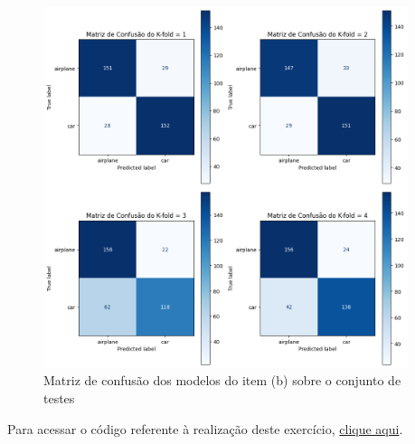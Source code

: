 \documentclass[]{abntex2}
\begin{document}
\begin{figure}[H]
    \centering 
    \includegraphics[width=0.95\textwidth]{imgs/ex3/conf4.png}
    \caption{Matriz de confusão dos modelos do item (b) sobre o conjunto de testes}
    \label{fig:conf4} %
\end{figure}

Para acessar o código referente à realização deste exercício, \href{https://github.com/lorran-araujo/LNCC/blob/main/disciplinas/redes-neurais/codes/lista3/exercicio3.ipynb}{clique aqui}.


\end{document}
